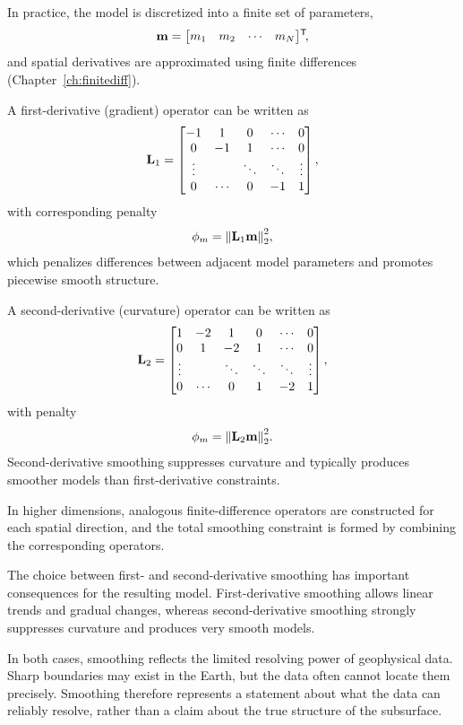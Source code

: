 In practice, the model is discretized into a finite set of parameters,
\[
    \vb{m} = \begin{bmatrix} m_1 & m_2 & \cdots & m_N \end{bmatrix}\!^\mathsf{T}\!,
\]
and spatial derivatives are approximated using finite differences (Chapter~\ref{ch:finitediff}).

A first-derivative (gradient) operator can be written as
\begin{equation}
    \vb{L}_1 =
    \begin{bmatrix}
        -1 & 1 & 0 & \cdots & 0 \\
        0 & -1 & 1 & \cdots & 0 \\
        \vdots & & \ddots & \ddots & \vdots \\
        0 & \cdots & 0 & -1 & 1
    \end{bmatrix},
\end{equation}
with corresponding penalty
\[
    \phi_m = \norm{\vb{L}_1 \vb{m}}_2^2,
\]
which penalizes differences between adjacent model parameters and promotes piecewise smooth structure.

A second-derivative (curvature) operator can be written as
\begin{equation}
    \vb{L}_2 =
    \begin{bmatrix}
        1 & -2 & 1 & 0 & \cdots & 0 \\
        0 & 1 & -2 & 1 & \cdots & 0 \\
        \vdots & & \ddots & \ddots & \ddots & \vdots \\
        0 & \cdots & 0 & 1 & -2 & 1
    \end{bmatrix},
\end{equation}
with penalty
\[
    \phi_m = \norm{\vb{L}_2 \vb{m}}_2^2.
\]
Second-derivative smoothing suppresses curvature and typically produces smoother models than first-derivative constraints.

In higher dimensions, analogous finite-difference operators are constructed for each spatial direction, and the total smoothing constraint is formed by combining the corresponding operators.

The choice between first- and second-derivative smoothing has important consequences for the resulting model. First-derivative smoothing allows linear trends and gradual changes, whereas second-derivative smoothing strongly suppresses curvature and produces very smooth models.

In both cases, smoothing reflects the limited resolving power of geophysical data. Sharp boundaries may exist in the Earth, but the data often cannot locate them precisely. Smoothing therefore represents a statement about what the data can reliably resolve, rather than a claim about the true structure of the subsurface.

